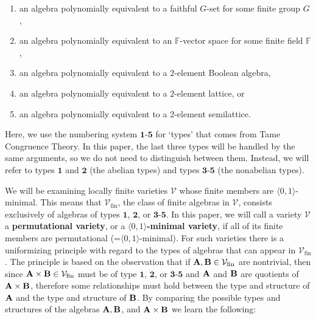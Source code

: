 \documentclass[12pt]{amsart}
\theoremstyle{definition}
\numberwithin{equation}{section}
\newcommand{\m}[1]{{\mathbf{\uppercase{#1}}}}
\begin{document}
\begin{enumerate}
\item[\textbf{1}.] an algebra polynomially equivalent to a faithful $G$-set
for some finite group $G$,
\smallskip

\item[\textbf{2}.] an algebra polynomially equivalent to an
  $\mathbb F$-vector space for some finite field $\mathbb F$, 
  \smallskip

\item[\textbf{3}.] an algebra polynomially equivalent
  to a $2$-element Boolean algebra,
  \smallskip

\item[\textbf{4}.] an algebra polynomially equivalent
  to a $2$-element lattice, or
  \smallskip

\item[\textbf{5}.] an algebra polynomially equivalent
  to a $2$-element semilattice.
\end{enumerate}
\smallskip

\noindent
Here, we use the numbering system $\mathbf{1}$-$\mathbf{5}$ for
`types' that comes from Tame Congruence Theory.
In this paper, the last three types will
be handled by the same arguments, so we do not
need to distinguish between them. Instead,
we will refer to types $\mathbf{1}$ and $\mathbf{2}$
(the abelian types) and types $\mathbf{3}$-$\mathbf{5}$
(the nonabelian types).

We will be examining locally finite varieties $\mathcal V$
whose finite members are $\langle 0,1\rangle$-minimal.
This means that ${\mathcal V}_{\textrm{fin}}$,
the class of finite algebras in $\mathcal{V}$,
consists exclusively of algebras of types $\mathbf{1}$, $\mathbf{2}$,
or $\mathbf{3}$-$\mathbf{5}$.
In this paper, we will call a
variety $\mathcal{V}$ a \textbf{permutational variety}, or a
\textbf{$\langle 0,1\rangle$-minimal variety},
if all of its finite members are
permutational (=$\langle 0,1\rangle$-minimal).
For such varieties there is a uniformizing principle
with regard to the types of algebras
that can appear in ${\mathcal V}_{\textrm{fin}}$.
The principle is based
on the observation that if $\m a, \m b\in {\mathcal V}_{\textrm{fin}}$
are nontrivial, then 
since $\m a\times \m b\in {\mathcal V}_{\textrm{fin}}$
must be of type $\mathbf{1}$, $\mathbf{2}$, or $\mathbf{3}$-$\mathbf{5}$ and 
$\m a$ and $\m b$ are quotients of $\m a\times \m b$,
therefore some relationships must hold
between the type and structure of $\m a$
and the type and structure of $\m b$.
By comparing the possible types and structures of the algebras
$\m a, \m b$, and $\m a\times \m b$ we learn the following:
\smallskip
\end{document}
